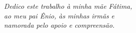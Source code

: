 \begin{dedicatoria}
   \vspace*{\fill}
   \centering
   \noindent

   \textit{Dedico este trabalho à minha mãe Fátima,\\
    ao meu pai Ênio, às minhas irmãs e \\
    namorada pelo apoio e compreensão.} \vspace*{\fill}
\end{dedicatoria}
